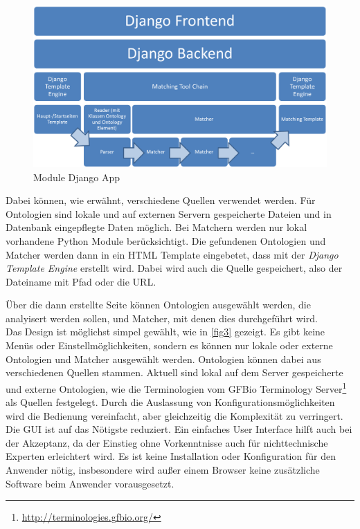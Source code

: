 		\begin{figure}[h!]
		\centering
		\includegraphics[width=1.0\textwidth]{pics/Module-overview1.png}
		\caption{Module Django App}
		\label{fig2}
		\end{figure}
		
		Dabei können, wie erwähnt, verschiedene Quellen verwendet werden. Für
		Ontologien sind lokale und auf externen Servern gespeicherte Dateien und in Datenbank
		eingepflegte Daten möglich. Bei Matchern werden nur lokal vorhandene Python
		Module berücksichtigt. Die gefundenen Ontologien und Matcher werden dann in
		ein HTML Template eingebetet, dass mit der \textit{Django Template Engine}
		erstellt wird. Dabei wird auch die Quelle gespeichert, also der Dateiname mit Pfad oder die URL.
		
		\pagebreak[4]
		
		Über die dann erstellte Seite können Ontologien ausgewählt werden, die
		analyisert werden sollen, und Matcher, mit denen dies durchgeführt wird.\\
		Das Design ist möglichst simpel gewählt, wie in \ref{fig3} gezeigt. Es gibt
		keine Menüs oder Einstellmöglichkeiten, sondern es können nur
		lokale oder externe Ontologien und Matcher ausgewählt
		werden. Ontologien können dabei aus verschiedenen Quellen stammen. Aktuell
		sind lokal auf dem Server gespeicherte und externe Ontologien, wie
		die Terminologien vom GFBio Terminology
		Server\footnote{\url{http://terminologies.gfbio.org/}} als Quellen festgelegt.
		Durch die Auslassung von Konfigurationsmöglichkeiten wird die Bedienung
		vereinfacht, aber gleichzeitig die Komplexität zu verringert. Die GUI ist auf
		das Nötigste reduziert. Ein einfaches User Interface hilft auch bei der Akzeptanz, da der
		Einstieg ohne Vorkenntnisse auch für nichttechnische Experten erleichtert
		wird. Es ist keine Installation oder Konfiguration für den Anwender nötig,
		insbesondere wird außer einem Browser keine zusätzliche Software beim Anwender
		vorausgesetzt.
		\pagebreak[4]
